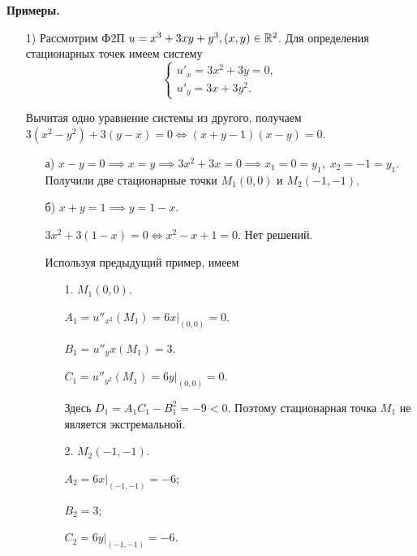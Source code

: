 \documentclass[../../main.tex]{subfiles}
\begin{document}
    \noindent\textbf{Примеры.}
    \begin{itemize}
        \item[1)] Рассмотрим Ф2П $u = x^3 + 3xy + y^3, (x,y) \in \mathbb{R}^2$. Для
        определения стационарных точек имеем систему
        \[
        \begin{cases}
            u'_x = 3x^2 + 3y = 0, \\
            u'_y = 3x + 3y^2.
        \end{cases}
        \]

        Вычитая одно уравнение системы из другого, получаем $3(x^2 - y^2) +
        3(y - x) = 0 \iff (x+y-1)(x-y)=0$.
        \begin{itemize}
            \item[а)] $x - y = 0 \implies x = y \implies 3x^2 + 3x = 0 \implies
            x_1 = 0 = y_1, \; x_2 = -1 = y_1.$
            Получили две стационарные точки $M_1(0,0)$ и $M_2(-1,-1)$.
            \item[б)] $x+y=1 \implies y = 1-x$.

            $3x^2 + 3(1-x) = 0 \iff x^2 - x + 1 = 0$. Нет решений.

            Используя предыдущий пример, имеем
            \begin{itemize}
                \item[1.] $M_1(0,0)$.

                $A_1 = u''_{x^2} (M_1) = 6x \big|_{(0,0)} = 0$.

                $B_1 = u''_yx (M_1) = 3$.

                $C_1 = u''_{y^2} (M_1) = 6y \big|_{(0,0)} = 0$.

                Здесь $D_1 = A_1C_1 - B_1^2 = -9 < 0$. Поэтому стационарная
                точка $M_1$ не является экстремальной.

                \item[2.] $M_2 (-1, -1)$.

                $A_2 = 6x \big|_{(-1,-1)} = -6$;

                $B_2 = 3$;

                $C_2 = 6y \big|_{(-1,-1)} = -6$.


\end{itemize}
\end{itemize}
\end{itemize}
\end{document}
